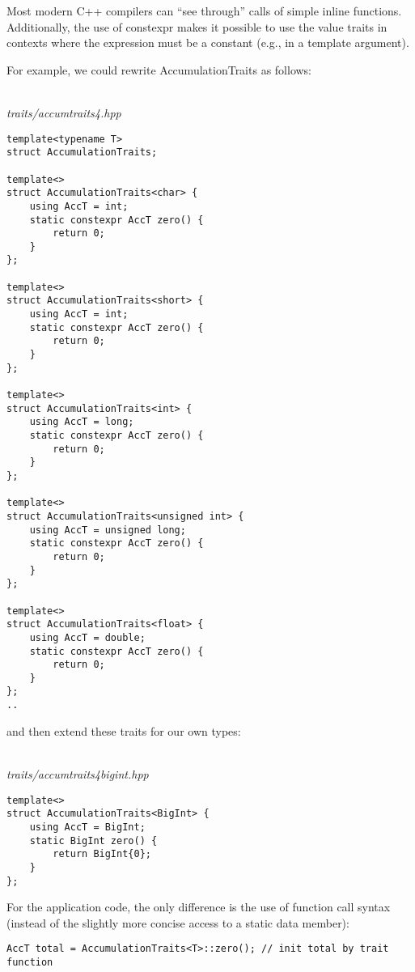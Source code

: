 \begin{tcolorbox}[colback=webgreen!5!white,colframe=webgreen!75!black]
\hspace*{0.75cm}Most modern C++ compilers can “see through” calls of simple inline functions. Additionally, the use of constexpr makes it possible to use the value traits in contexts where the expression must be a constant (e.g., in a template argument).
\end{tcolorbox}

For example, we could rewrite AccumulationTraits as follows:

\hspace*{\fill} \\ %
\noindent
\textit{traits/accumtraits4.hpp}
\begin{lstlisting}[style=styleCXX]
template<typename T>
struct AccumulationTraits;

template<>
struct AccumulationTraits<char> {
	using AccT = int;
	static constexpr AccT zero() {
		return 0;
	}
};

template<>
struct AccumulationTraits<short> {
	using AccT = int;
	static constexpr AccT zero() {
		return 0;
	}
};

template<>
struct AccumulationTraits<int> {
	using AccT = long;
	static constexpr AccT zero() {
		return 0;
	}
};

template<>
struct AccumulationTraits<unsigned int> {
	using AccT = unsigned long;
	static constexpr AccT zero() {
		return 0;
	}
};

template<>
struct AccumulationTraits<float> {
	using AccT = double;
	static constexpr AccT zero() {
		return 0;
	}
};
..
\end{lstlisting}

and then extend these traits for our own types:

\hspace*{\fill} \\ %
\noindent
\textit{traits/accumtraits4bigint.hpp}
\begin{lstlisting}[style=styleCXX]
template<>
struct AccumulationTraits<BigInt> {
	using AccT = BigInt;
	static BigInt zero() {
		return BigInt{0};
	}
};
\end{lstlisting}

For the application code, the only difference is the use of function call syntax (instead of the slightly more concise access to a static data member):

\begin{lstlisting}[style=styleCXX]
AccT total = AccumulationTraits<T>::zero(); // init total by trait function
\end{lstlisting}

